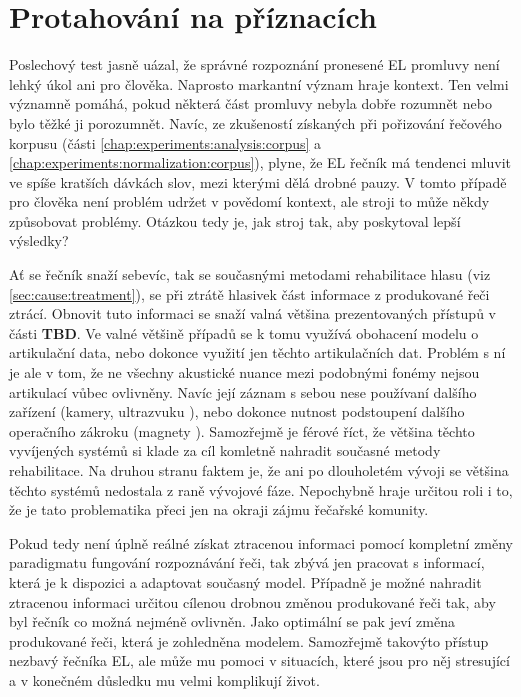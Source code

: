 \section{Protahování na příznacích}
\label{chap:experiments:poc}

Poslechový test jasně uázal, že správné rozpoznání pronesené EL promluvy není lehký úkol ani pro člověka. Naprosto markantní význam hraje kontext. Ten velmi významně pomáhá, pokud některá část promluvy nebyla dobře rozumnět nebo bylo těžké ji porozumnět. Navíc, ze zkušeností získaných při pořizování řečového korpusu (části \ref{chap:experiments:analysis:corpus} a \ref{chap:experiments:normalization:corpus}), plyne, že EL řečník má tendenci mluvit ve spíše kratších dávkách slov, mezi kterými dělá drobné pauzy. V tomto případě pro člověka není problém udržet v povědomí kontext, ale stroji to může někdy způsobovat problémy. Otázkou tedy je, jak  stroj tak, aby poskytoval lepší výsledky?

Ať se řečník snaží sebevíc, tak se současnými metodami rehabilitace hlasu (viz \ref{sec:cause:treatment}), se při ztrátě hlasivek část informace z produkované řeči ztrácí. Obnovit tuto informaci se snaží valná většina prezentovaných přístupů v části \textbf{TBD}. Ve valné většině případů se k tomu využívá obohacení modelu o artikulační data, nebo dokonce využití jen těchto artikulačních dat. \cite{Denby2010} \cite{Hofe2013} Problém s ní je ale v tom, že ne všechny akustické nuance mezi podobnými fonémy nejsou artikulací vůbec ovlivněny. Navíc její záznam s sebou nese používaní dalšího zařízení (kamery, ultrazvuku \cite{Hueber2010}), nebo dokonce nutnost podstoupení dalšího operačního zákroku (magnety \cite{Hofe2011}). Samozřejmě je férové říct, že většina těchto vyvíjených systémů si klade za cíl komletně nahradit současné metody rehabilitace. Na druhou stranu faktem je, že ani po dlouholetém vývoji se většina těchto systémů nedostala z raně vývojové fáze. Nepochybně hraje určitou roli i to, že je tato problematika přeci jen na okraji zájmu řečařské komunity.

Pokud tedy není úplně reálné získat ztracenou informaci pomocí kompletní změny paradigmatu fungování rozpoznávání řeči, tak zbývá jen pracovat s informací, která je k dispozici a adaptovat současný model. Případně je možné nahradit ztracenou informaci určitou cílenou drobnou změnou produkované řeči tak, aby byl řečník co možná nejméně ovlivněn. Jako optimální se pak jeví změna produkované řeči, která je zohledněna modelem. Samozřejmě takovýto přístup nezbavý řečníka EL, ale může mu pomoci v situacích, které jsou pro něj stresující a v konečném důsledku mu velmi komplikují život.

